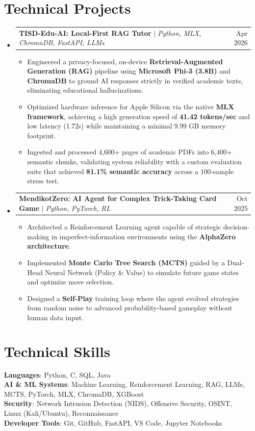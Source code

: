 \documentclass[a4paper,10pt]{article}
\makeatletter
\newcommand{\resumeItem}[1]{
  \item\small{
    {#1 \vspace{-2pt}}
  }
}
\newcommand{\resumeProjectHeading}[2]{
    \item
    \begin{tabular*}{0.97\textwidth}{l@{\extracolsep{\fill}}r}
      \small#1 & #2 \\
    \end{tabular*}\vspace{-7pt}
}
\newcommand{\resumeSubHeadingListStart}{\begin{itemize}[leftmargin=0.15in, label={}]}
\newcommand{\resumeSubHeadingListEnd}{\end{itemize}}
\newcommand{\resumeItemListStart}{\begin{itemize}}
\newcommand{\resumeItemListEnd}{\end{itemize}\vspace{-5pt}}
\makeatother
\begin{document}
\section{Technical Projects}
  \resumeSubHeadingListStart

    \resumeProjectHeading
      {\textbf{TISD-Edu-AI: Local-First RAG Tutor} $|$ \emph{Python, MLX, ChromaDB, FastAPI, LLMs}}{Apr 2026}
      \resumeItemListStart
        \resumeItem{Engineered a privacy-focused, on-device \textbf{Retrieval-Augmented Generation (RAG)} pipeline using \textbf{Microsoft Phi-3 (3.8B)} and \textbf{ChromaDB} to ground AI responses strictly in verified academic texts, eliminating educational hallucinations.}
        \resumeItem{Optimized hardware inference for Apple Silicon via the native \textbf{MLX framework}, achieving a high generation speed of \textbf{41.42 tokens/sec} and low latency (1.72s) while maintaining a minimal 9.99 GB memory footprint.}
        \resumeItem{Ingested and processed 4,600+ pages of academic PDFs into 6,400+ semantic chunks, validating system reliability with a custom evaluation suite that achieved \textbf{81.1\% semantic accuracy} across a 100-sample stress test.}
      \resumeItemListEnd
      
    \resumeProjectHeading
      {\textbf{MendikotZero: AI Agent for Complex Trick-Taking Card Game} $|$ \emph{Python, PyTorch, RL}}{Oct 2025}
      \resumeItemListStart
        \resumeItem{Architected a Reinforcement Learning agent capable of strategic decision-making in imperfect-information environments using the \textbf{AlphaZero architecture}.}
        \resumeItem{Implemented \textbf{Monte Carlo Tree Search (MCTS)} guided by a Dual-Head Neural Network (Policy \& Value) to simulate future game states and optimize move selection.}
        \resumeItem{Designed a \textbf{Self-Play} training loop where the agent evolved strategies from random noise to advanced probability-based gameplay without human data input.}
      \resumeItemListEnd

  \resumeSubHeadingListEnd

\section{Technical Skills}
 \begin{itemize}[leftmargin=0.15in, label={}]
    \small{\item{
     \textbf{Languages}{: Python, C, SQL, Java} \\
     \textbf{AI \& ML Systems}{: Machine Learning, Reinforcement Learning, RAG, LLMs, MCTS, PyTorch, MLX, ChromaDB, XGBoost} \\
     \textbf{Security}{: Network Intrusion Detection (NIDS), Offensive Security, OSINT, Linux (Kali/Ubuntu), Reconnaissance} \\
     \textbf{Developer Tools}{: Git, GitHub, FastAPI, VS Code, Jupyter Notebooks}
    }}
 \end{itemize}
\end{document}
